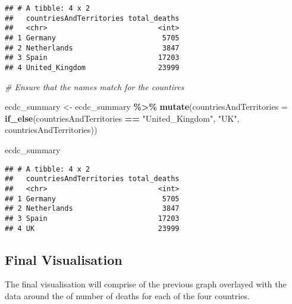 \documentclass[
]{article}
\newenvironment{Shaded}{\begin{snugshade}}{\end{snugshade}}
\newcommand{\AttributeTok}[1]{\textcolor[rgb]{0.13,0.29,0.53}{#1}}
\newcommand{\CommentTok}[1]{\textcolor[rgb]{0.56,0.35,0.01}{\textit{#1}}}
\newcommand{\FunctionTok}[1]{\textcolor[rgb]{0.13,0.29,0.53}{\textbf{#1}}}
\newcommand{\NormalTok}[1]{#1}
\newcommand{\OtherTok}[1]{\textcolor[rgb]{0.56,0.35,0.01}{#1}}
\newcommand{\SpecialCharTok}[1]{\textcolor[rgb]{0.81,0.36,0.00}{\textbf{#1}}}
\newcommand{\StringTok}[1]{\textcolor[rgb]{0.31,0.60,0.02}{#1}}
\begin{document}
\begin{verbatim}
## # A tibble: 4 x 2
##   countriesAndTerritories total_deaths
##   <chr>                          <int>
## 1 Germany                         5705
## 2 Netherlands                     3847
## 3 Spain                          17203
## 4 United_Kingdom                 23999
\end{verbatim}

\begin{Shaded}
\begin{Highlighting}[]
\CommentTok{\# Ensure that the names match for the countires}

\NormalTok{ecdc\_summary }\OtherTok{\textless{}{-}}\NormalTok{ ecdc\_summary }\SpecialCharTok{\%\textgreater{}\%}
  \FunctionTok{mutate}\NormalTok{(}\AttributeTok{countriesAndTerritories =} \FunctionTok{if\_else}\NormalTok{(countriesAndTerritories }\SpecialCharTok{==} \StringTok{"United\_Kingdom"}\NormalTok{, }\StringTok{"UK"}\NormalTok{, countriesAndTerritories))}

\NormalTok{ecdc\_summary}
\end{Highlighting}
\end{Shaded}

\begin{verbatim}
## # A tibble: 4 x 2
##   countriesAndTerritories total_deaths
##   <chr>                          <int>
## 1 Germany                         5705
## 2 Netherlands                     3847
## 3 Spain                          17203
## 4 UK                             23999
\end{verbatim}

\subsection{Final Visualisation}\label{final-visualisation}

The final visualisation will comprise of the previous graph overlayed
with the data around the of number of deaths for each of the four
countries.
\end{document}
